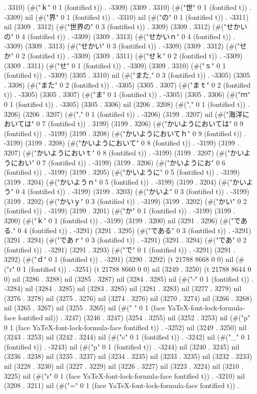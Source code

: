 . 3310) (#("ｋ" 0 1 (fontified t)) . -3309) (3309 . 3310) (#("世" 0 1 (fontified t)) . -3309) nil (#("界" 0 1 (fontified t)) . -3310) nil (#("の" 0 1 (fontified t)) . -3311) nil (3309 . 3312) (#("世界の" 0 3 (fontified t)) . 3309) (3309 . 3312) (#("せかいの" 0 4 (fontified t)) . -3309) (3309 . 3313) (#("せかいｎ" 0 4 (fontified t)) . -3309) (3309 . 3313) (#("せかい" 0 3 (fontified t)) . -3309) (3309 . 3312) (#("せか" 0 2 (fontified t)) . -3309) (3309 . 3311) (#("せｋ" 0 2 (fontified t)) . -3309) (3309 . 3311) (#("せ" 0 1 (fontified t)) . -3309) (3309 . 3310) (#("ｓ" 0 1 (fontified t)) . -3309) (3305 . 3310) nil (#("また," 0 3 (fontified t)) . -3305) (3305 . 3308) (#("また" 0 2 (fontified t)) . -3305) (3305 . 3307) (#("まｔ" 0 2 (fontified t)) . -3305) (3305 . 3307) (#("ま" 0 1 (fontified t)) . -3305) (3305 . 3306) (#("ｍ" 0 1 (fontified t)) . -3305) (3305 . 3306) nil (3206 . 3208) (#("," 0 1 (fontified t)) . 3206) (3206 . 3207) (#("," 0 1 (fontified t)) . -3206) (3199 . 3207) nil (#("海洋においては" 0 7 (fontified t)) . 3199) (3199 . 3206) (#("かいようにおいては" 0 9 (fontified t)) . -3199) (3199 . 3208) (#("かいようにおいてｈ" 0 9 (fontified t)) . -3199) (3199 . 3208) (#("かいようにおいて" 0 8 (fontified t)) . -3199) (3199 . 3207) (#("かいようにおいｔ" 0 8 (fontified t)) . -3199) (3199 . 3207) (#("かいようにおい" 0 7 (fontified t)) . -3199) (3199 . 3206) (#("かいようにお" 0 6 (fontified t)) . -3199) (3199 . 3205) (#("かいように" 0 5 (fontified t)) . -3199) (3199 . 3204) (#("かいようｎ" 0 5 (fontified t)) . -3199) (3199 . 3204) (#("かいよう" 0 4 (fontified t)) . -3199) (3199 . 3203) (#("かいよ" 0 3 (fontified t)) . -3199) (3199 . 3202) (#("かいｙ" 0 3 (fontified t)) . -3199) (3199 . 3202) (#("かい" 0 2 (fontified t)) . -3199) (3199 . 3201) (#("か" 0 1 (fontified t)) . -3199) (3199 . 3200) (#("ｋ" 0 1 (fontified t)) . -3199) (3199 . 3200) nil (3291 . 3296) (#("である." 0 4 (fontified t)) . -3291) (3291 . 3295) (#("である" 0 3 (fontified t)) . -3291) (3291 . 3294) (#("であｒ" 0 3 (fontified t)) . -3291) (3291 . 3294) (#("であ" 0 2 (fontified t)) . -3291) (3291 . 3293) (#("で" 0 1 (fontified t)) . -3291) (3291 . 3292) (#("ｄ" 0 1 (fontified t)) . -3291) (3290 . 3292) (t 21788 8668 0 0) nil (#("r" 0 1 (fontified t)) . -3251) (t 21788 8660 0 0) nil (3249 . 3250) (t 21788 8644 0 0) nil (3286 . 3288) nil (3285 . 3287) nil (3284 . 3285) nil (#("-" 0 1 (fontified t)) . -3284) nil (3284 . 3285) nil (3283 . 3285) nil (3281 . 3283) nil (3277 . 3279) nil (3276 . 3278) nil (3275 . 3276) nil (3274 . 3276) nil (3270 . 3274) nil (3266 . 3268) nil (3265 . 3267) nil (3255 . 3265) nil (#(" " 0 1 (face YaTeX-font-lock-formula-face fontified nil)) . 3247) (3246 . 3247) (3254 . 3255) nil (3252 . 3253) nil (#("p" 0 1 (face YaTeX-font-lock-formula-face fontified t)) . -3252) nil (3249 . 3250) nil (3243 . 3253) nil (3242 . 3244) nil (#("c" 0 1 (fontified t)) . -3242) nil (#("_" 0 1 (fontified t)) . -3243) nil (#("p" 0 1 (fontified t)) . -3244) nil (3240 . 3245) nil (3236 . 3238) nil (3235 . 3237) nil (3234 . 3235) nil (3233 . 3235) nil (3232 . 3233) nil (3228 . 3230) nil (3227 . 3229) nil (3226 . 3227) nil (3223 . 3224) nil (3210 . 3225) nil (#("r" 0 1 (face YaTeX-font-lock-formula-face fontified t)) . -3210) nil (3208 . 3211) nil (#("=" 0 1 (face YaTeX-font-lock-formula-face fontified t)) . 